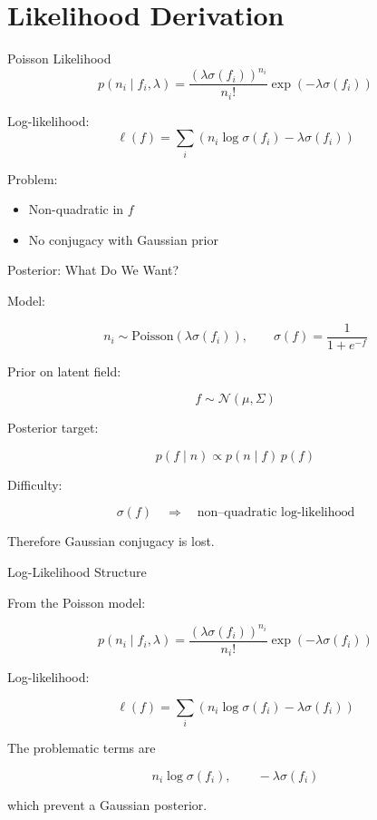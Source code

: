 \documentclass[11pt]{beamer}
\begin{document}
\section{Likelihood Derivation}

\begin{frame}{Poisson Likelihood}
\[
p(n_i \mid f_i,\lambda)
=
\frac{(\lambda \sigma(f_i))^{n_i}}{n_i!}
\exp(-\lambda \sigma(f_i))
\]

Log-likelihood:
\[
\ell(f)
=
\sum_i
\left(
n_i \log \sigma(f_i)
-
\lambda \sigma(f_i)
\right)
\]


Problem:
\begin{itemize}
\item Non-quadratic in $f$
\item No conjugacy with Gaussian prior
\end{itemize}
\end{frame}

\begin{frame}{Posterior: What Do We Want?}

Model:

\[
n_i \sim \text{Poisson}(\lambda \sigma(f_i)),
\qquad
\sigma(f)=\frac{1}{1+e^{-f}}
\]

Prior on latent field:

\[
f \sim \mathcal{N}(\mu,\Sigma)
\]

Posterior target:

\[
p(f \mid n) \propto p(n \mid f)\, p(f)
\]

Difficulty:

\[
\sigma(f) \quad \Rightarrow \quad
\text{non–quadratic log-likelihood}
\]

Therefore Gaussian conjugacy is lost.

\end{frame}

\begin{frame}{Log-Likelihood Structure}

From the Poisson model:

\[
p(n_i \mid f_i,\lambda)
=
\frac{(\lambda \sigma(f_i))^{n_i}}{n_i!}
\exp(-\lambda \sigma(f_i))
\]

Log-likelihood:

\[
\ell(f)
=
\sum_i
\left(
n_i \log\sigma(f_i)
-
\lambda\sigma(f_i)
\right)
\]

The problematic terms are

\[
n_i\log\sigma(f_i), 
\qquad
-\lambda\sigma(f_i)
\]

which prevent a Gaussian posterior.

\end{frame}
\end{document}
